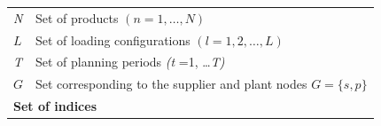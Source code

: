 \begin{longtable}[hbt!]{  |p{}|p{}  |}
  \textit{N}                                                                                     & Set of products $(n =   1,\dots,N)$                                                                                                                                                                                                                                                                                                                                                                                                                                                                                                                                            \\
  $L$                                                                                            & Set of loading configurations $(l =1,2,\dots , L)$
  \\
  \textit{T}                                                                                     & Set of planning periods \textit{(t} =1, \dots \textit{T)}                                                                                                                                                                                                                                                                                                                                                                                                                                                                                                                      \\
  $G$                                                                                            & Set corresponding to the supplier and plant nodes $G = \lbrace s, p \rbrace$                                                                                                                                                                                                                                                                                                                                                                                                                                                                                                   \\
  \hline
  \multicolumn{2}{|l|}{\textbf{Set of indices}}                                                                                                                                                                                                                                                                                                                                                                                                                                                                                                                                                                                                                                   \\ \hline

\end{longtable}
